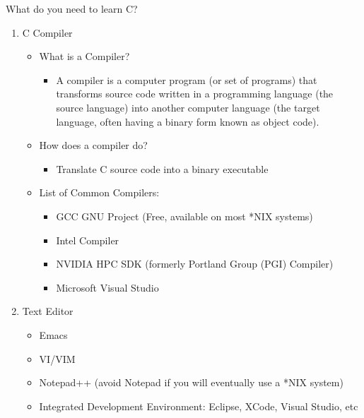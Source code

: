 \documentclass[10pt,t]{beamer}
\begin{document}
\begin{frame}{What do you need to learn C?}
  \begin{enumerate}
    \item {C Compiler}
      \begin{itemize}
        \item What is a Compiler?
          \begin{itemize}
            \item A compiler is a computer program (or set of programs) that transforms source code written in a programming language (the source language) into another computer language (the target language, often having a binary form known as object code).
          \end{itemize}
        \item How does a compiler do?
          \begin{itemize}
            \item Translate C source code into a binary executable
          \end{itemize}
        \item List of Common Compilers:
          \begin{itemize}
            \item GCC GNU Project (Free, available on most *NIX systems)
            \item Intel Compiler
            \item NVIDIA HPC SDK (formerly Portland Group (PGI) Compiler)
            \item Microsoft Visual Studio
          \end{itemize}
      \end{itemize}
    \item {Text Editor}
      \begin{itemize}
        \item Emacs
        \item VI/VIM
        \item Notepad++ (avoid Notepad if you will eventually use a *NIX system)
        \item Integrated Development Environment: Eclipse, XCode, Visual Studio, etc
      \end{itemize}
  \end{enumerate}
\end{frame}
\end{document}
